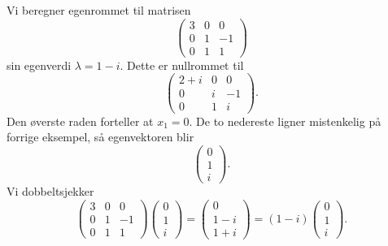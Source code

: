 \begin{ex}
Vi beregner egenrommet til matrisen
\[
\begin{pmatrix}
3 & 0 & 0 \\ 0 & 1 & -1 \\ 0&  1 &1  
\end{pmatrix}
\]
sin egenverdi $\lambda= 1-i$. Dette er nullrommet til
\[
\begin{pmatrix}
2+i & 0 & 0 \\ 0 & i & -1 \\ 0&  1 &i  
\end{pmatrix}.
\]
Den øverste raden forteller at $x_1=0$. De to nedereste ligner mistenkelig på forrige eksempel, så egenvektoren blir 
\[
\begin{pmatrix}
0 \\ 1  \\ i 
\end{pmatrix}.
\]
Vi dobbeltsjekker
\[
\begin{pmatrix}
3 & 0 & 0 \\ 0 & 1 & -1 \\ 0&  1 &1  
\end{pmatrix}
\begin{pmatrix}
0 \\ 1  \\ i 
\end{pmatrix}
=
\begin{pmatrix}
0 \\ 1-i  \\ 1+i 
\end{pmatrix}
=
(1-i)
\begin{pmatrix}
0 \\ 1  \\ i 
\end{pmatrix}.
\]

\end{ex}


